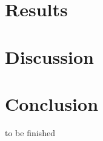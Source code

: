 \documentclass[acmtog]{acmart}
\begin{document}
\section{Results}
\label{results}



\section{Discussion}
\label{discussion}




\section{Conclusion}
\label{conclusion}


\begin{acks}
to be finished
\end{acks}





\end{document}
